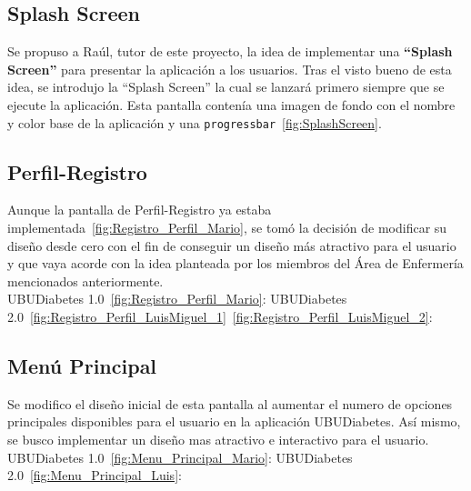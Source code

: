 \subsection{Splash Screen}
Se propuso a Raúl, tutor de este proyecto, la idea de implementar una \textbf{``Splash Screen''} para presentar la aplicación a los usuarios. Tras el visto bueno de esta idea, se introdujo la ``Splash Screen'' la cual se lanzará primero siempre que se ejecute la aplicación. Esta pantalla contenía una imagen de fondo con el nombre y color base de la aplicación y una \texttt{progressbar}~\ref{fig:SplashScreen}.

\subsection{Perfil-Registro}
Aunque la pantalla de Perfil-Registro ya estaba implementada~\ref{fig:Registro_Perfil_Mario}, se tomó la decisión de modificar su diseño desde cero con el fin de conseguir un diseño más atractivo para el usuario y que vaya acorde con la idea planteada por los miembros del Área de Enfermería mencionados anteriormente.\\
UBUDiabetes 1.0~\ref{fig:Registro_Perfil_Mario}:
\newpage
UBUDiabetes 2.0~\ref{fig:Registro_Perfil_LuisMiguel_1}~\ref{fig:Registro_Perfil_LuisMiguel_2}:
\newpage
\subsection{Menú Principal}
Se modifico el diseño inicial de esta pantalla al aumentar el numero de opciones principales disponibles para el usuario en la aplicación UBUDiabetes. Así mismo, se busco implementar un diseño mas atractivo e interactivo para el usuario.\\
UBUDiabetes 1.0~\ref{fig:Menu_Principal_Mario}:
UBUDiabetes 2.0~\ref{fig:Menu_Principal_Luis}:
